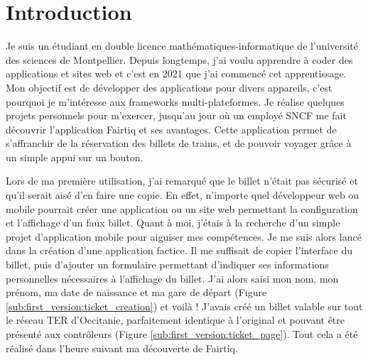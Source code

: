 \documentclass[a4paper]{article}
\begin{document}
\section{Introduction}

Je suis un étudiant en double licence mathématiques-informatique de l'université des sciences de Montpellier.
Depuis longtemps, j'ai voulu apprendre à coder des applications et sites web et c'est en 2021 que
j'ai commencé cet apprentissage. Mon objectif est de développer des applications pour divers appareils,
c'est pourquoi je m'intéresse aux frameworks multi-plateformes.
Je réalise quelques projets personnels pour m'exercer, jusqu'au jour
où un employé SNCF me fait découvrir l'application Fairtiq et ses avantages.
Cette application permet de s'affranchir de la réservation des billets de trains, et de pouvoir voyager
grâce à un simple appui sur un bouton.

Lors de ma première utilisation, j'ai remarqué que le billet n'était pas sécurisé
et qu'il serait aisé d'en faire une copie. En effet, n'importe quel développeur web ou mobile pourrait
créer une application ou un site web permettant la configuration et l'affichage d'un faux billet.
Quant à moi, j'étais à la recherche d'un simple projet d'application mobile pour aiguiser mes compétences.
Je me suis alors lancé dans la création d'une application factice.
Il me suffisait de copier l'interface du billet, puis d'ajouter un formulaire permettant d'indiquer
ses informations personnelles nécessaires à l'affichage du billet.
J'ai alors saisi mon nom, mon prénom, ma date de naissance et ma gare de départ (Figure \ref*{sub:first_version:ticket_creation}) et voilà ! J'avais créé
un billet valable sur tout le réseau TER d'Occitanie, parfaitement identique à l'original et pouvant
être présenté aux contrôleurs (Figure \ref*{sub:first_version:ticket_page}). Tout cela a été réalisé dans l'heure suivant ma découverte de Fairtiq.
\end{document}
